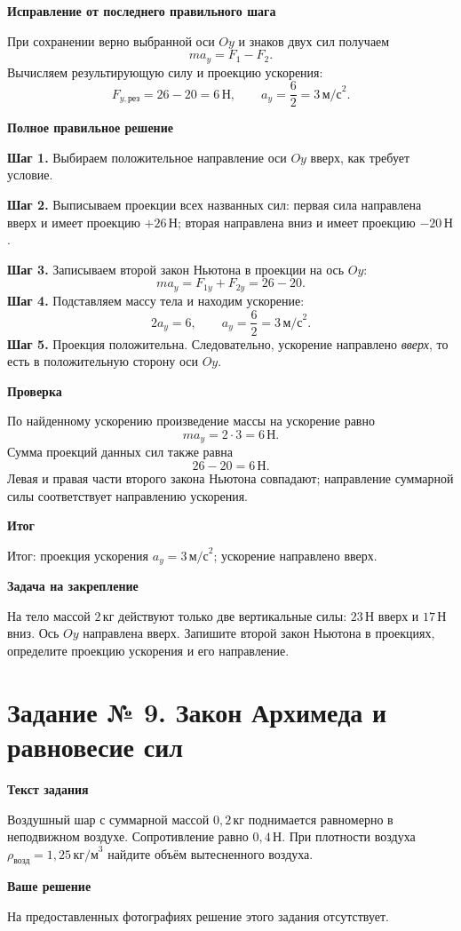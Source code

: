 \documentclass[12pt,a4paper]{article}
\newcommand{\reviewfield}[1]{\par\smallskip\noindent\textbf{#1}\par}
\newcommand{\mathunit}[1]{\,\text{#1}}
\begin{document}
\reviewfield{Исправление от последнего правильного шага}
При сохранении верно выбранной оси $Oy$ и знаков двух сил получаем
\[
ma_y=F_1-F_2.
\]
Вычисляем результирующую силу и проекцию ускорения:
\[
F_{y,\text{рез}}=26-20=6\mathunit{Н},
\qquad
 a_y=\frac{6}{2}=3\,\text{м/с}^{2}.
\]

\reviewfield{Полное правильное решение}
\textbf{Шаг 1.} Выбираем положительное направление оси $Oy$ вверх, как требует условие.

\textbf{Шаг 2.} Выписываем проекции всех названных сил: первая сила направлена вверх и имеет проекцию $+26\mathunit{Н}$; вторая направлена вниз и имеет проекцию $-20\mathunit{Н}$.

\textbf{Шаг 3.} Записываем второй закон Ньютона в проекции на ось $Oy$:
\[
ma_y=F_{1y}+F_{2y}=26-20.
\]
\textbf{Шаг 4.} Подставляем массу тела и находим ускорение:
\[
2a_y=6,
\qquad a_y=\frac{6}{2}=3\,\text{м/с}^{2}.
\]
\textbf{Шаг 5.} Проекция положительна. Следовательно, ускорение направлено \emph{вверх}, то есть в положительную сторону оси $Oy$.

\reviewfield{Проверка}
По найденному ускорению произведение массы на ускорение равно
\[
ma_y=2\cdot3=6\mathunit{Н}.
\]
Сумма проекций данных сил также равна
\[
26-20=6\mathunit{Н}.
\]
Левая и правая части второго закона Ньютона совпадают; направление суммарной силы соответствует направлению ускорения.

\reviewfield{Итог}
\textcolor{teal!60!black}{Итог:} проекция ускорения $a_y=3\,\text{м/с}^{2}$; ускорение направлено вверх.

\reviewfield{Задача на закрепление}
На тело массой $2\mathunit{кг}$ действуют только две вертикальные силы: $23\mathunit{Н}$ вверх и $17\mathunit{Н}$ вниз. Ось $Oy$ направлена вверх. Запишите второй закон Ньютона в проекциях, определите проекцию ускорения и его направление.
\newpage

\label{task:9}
\section*{Задание № 9. Закон Архимеда и равновесие сил}
\reviewfield{Текст задания}
Воздушный шар с суммарной массой $0{,}2\mathunit{кг}$ поднимается равномерно в неподвижном воздухе. Сопротивление равно $0{,}4\mathunit{Н}$. При плотности воздуха $\rho_{\text{возд}}=1{,}25\,\text{кг/м}^{3}$ найдите объём вытесненного воздуха.

\reviewfield{Ваше решение}
На предоставленных фотографиях решение этого задания отсутствует.
\end{document}
